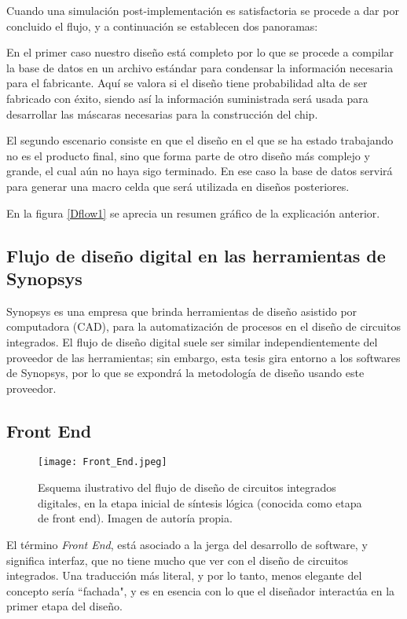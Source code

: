 Cuando una simulación post-implementación es satisfactoria se procede a dar por concluido el flujo, y a continuación se establecen dos panoramas:

En el primer caso nuestro diseño está completo por lo que se procede a compilar la base de datos en un archivo estándar para condensar la información necesaria para el fabricante. Aquí se valora si el diseño tiene probabilidad alta de ser fabricado con éxito, siendo así la información suministrada será usada para desarrollar las máscaras necesarias para la construcción del chip.

El segundo escenario consiste en que el diseño en el que se ha estado trabajando no es el producto final, sino que forma parte de otro diseño más complejo y grande, el cual aún no haya sigo terminado. En ese caso la base de datos servirá para generar una macro celda que será utilizada en diseños posteriores.

En la figura \ref{Dflow1} se aprecia un resumen gráfico de la explicación anterior.

\subsection{Flujo de diseño digital en las herramientas de Synopsys}

Synopsys es una empresa que brinda herramientas de diseño asistido por computadora (CAD), para la automatización de procesos en el diseño de circuitos integrados. El flujo de diseño digital suele ser similar independientemente del proveedor de las herramientas; sin embargo, esta tesis gira entorno a los softwares de Synopsys, por lo que se expondrá la metodología de diseño usando este proveedor.

\subsection{Front End}

\begin{figure}[h]
\texttt{[image: Front\_End.jpeg]}
\centering
\caption{Esquema ilustrativo del flujo de diseño de circuitos integrados digitales, en la etapa inicial de síntesis lógica (conocida como etapa de front end). Imagen de autoría propia.}
\label{fe}
\end{figure}


El término \textit{Front End}, está asociado a la jerga del desarrollo de software, y significa interfaz, que no tiene mucho que ver con el diseño de circuitos integrados. Una traducción más literal, y por lo tanto, menos elegante del concepto sería ``fachada", y es en esencia con lo que el diseñador interactúa en la primer etapa del diseño.

